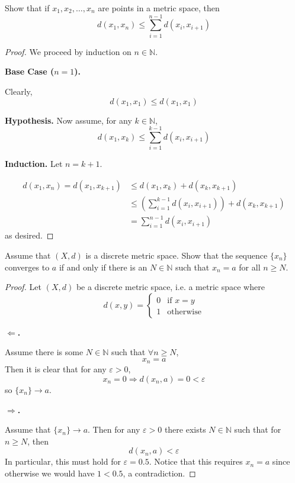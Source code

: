 \begin{prob}[3.1.7 Spaces]
    Show that if $x_1, x_2, \ldots, x_n$ are points in a metric space,
    then 
    \[
        d(x_1,x_n) \leq \displaystyle\sum_{i=1}^{n-1} d(x_i, x_{i+1})
    \]
\end{prob}
\begin{proof}
    We proceed by induction on $n \in \mathbb N$. 

    \textbf{Base Case ($n=1$).}

    Clearly, 
    \[
        d(x_1, x_1) \leq d(x_1, x_1)
    \]

    \textbf{Hypothesis.}
    Now assume, for any $k \in \mathbb N$, 
    \[
        d(x_1, x_k) \leq \displaystyle\sum_{i=1}^{k-1}d(x_i, x_{i+1})
    \]

    \textbf{Induction.}
    Let $n = k+1$. 

    \begin{align*}
        d(x_1, x_n) = d(x_1, x_{k+1}) &\leq d(x_1, x_k) + 
        d(x_k, x_{k+1}) \\ 
    &\leq \left(\displaystyle\sum_{i=1}^{k-1} d(x_i, x_{i+1})\right) 
    + d(x_k, x_{k+1}) \\ 
    &= \displaystyle\sum_{i=1}^{n-1} d(x_i, x_{i+1})
    \end{align*}
    as desired. 
\end{proof}

\begin{prob}[3.2.1 Spaces]
    Assume that $(X,d)$ is a discrete metric space. Show that 
    the sequence $\{x_n\}$ converges to $a$ if and only if there is an 
    $N \in \mathbb N$ such that $x_n = a$ for all $n \geq N$. 
\end{prob}
\begin{proof}
    Let $(X,d)$ be a discrete metric space, i.e. a metric space where
    \[
        d(x,y) = 
        \begin{cases}
            0 & \text{if } x = y \\ 
            1 & \text{otherwise}
        \end{cases}
    \]

    \textbf{$\Leftarrow$.} 
    
    Assume there is some $N \in \mathbb N$ such that 
    $\forall n \geq N$, 
    \[
        x_n = a
    \]
    Then it is clear that for any $\varepsilon > 0$, 
    \[
        x_n = 0 \Rightarrow  d(x_n,a) = 0 < \varepsilon
    \]
    so $\{x_n\} \to a$. 

    \textbf{$\Rightarrow$.}

    Assume that $\{x_n\} \to a$. Then for any $\varepsilon > 0$ 
    there exists $N \in \mathbb N$ such that for $n \geq N$, then 
    \[
        d(x_n, a) < \varepsilon
    \]
    In particular, this must hold for $\varepsilon = 0.5$. 
    Notice that this requires $x_n = a$ since otherwise we would 
    have $1 < 0.5$, a contradiction. 
\end{proof}

